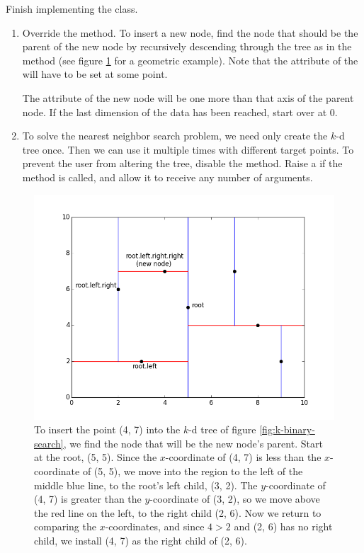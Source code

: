 \begin{problem} %
Finish implementing the  class.
\begin{enumerate}
\item Override the  method.
To insert a new node, find the node that should be the parent of the new node by recursively descending through the tree as in the  method (see figure \ref{fig:k-insert} for a geometric example).
Note that the  attribute of the will have to be set at some point.

The  attribute of the new node will be one more than that axis of the parent node.
If the last dimension of the data has been reached, start  over at 0.

\item To solve the nearest neighbor search problem, we need only create the $k$-d tree once.
Then we can use it multiple times with different target points.
To prevent the user from altering the tree, disable the  method.
Raise a  if the method is called, and allow it to receive any number of arguments.
\end{enumerate}
\end{problem}

\begin{figure}[H]
\includegraphics[width=\textwidth]{figures/kdpic2.png}
\caption{To insert the point (4, 7) into the $k$-d tree of figure \ref{fig:k-binary-search}, we find the node that will be the new node's parent. Start at the root, (5, 5). Since the $x$-coordinate of (4, 7) is less than the $x$-coordinate of (5, 5), we move into the region to the left of the middle blue line, to the root's left child, (3, 2). The $y$-coordinate of (4, 7) is greater than the $y$-coordinate of (3, 2), so we move above the red line on the left, to the right child (2, 6). Now we return to comparing the $x$-coordinates, and since $4 > 2$ and (2, 6) has no right child, we install (4, 7) as the right child of (2, 6).}
\label{fig:k-insert}
\end{figure}

